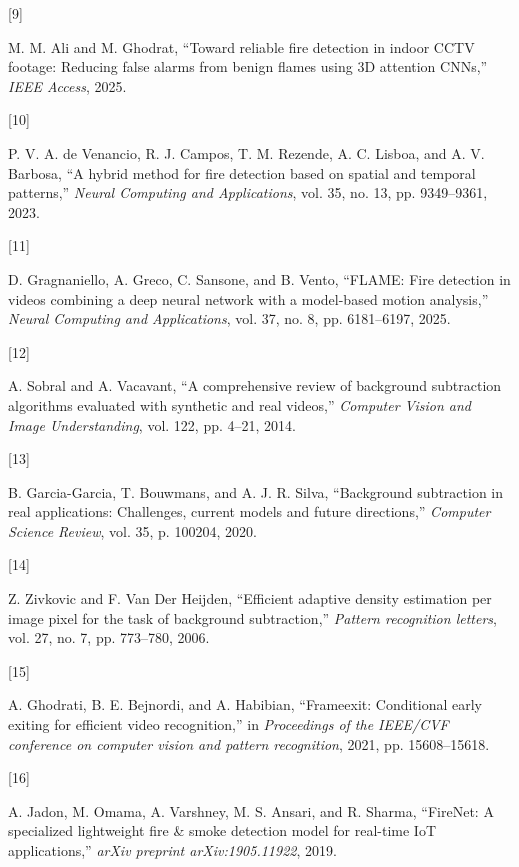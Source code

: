 \documentclass[
  10pt,
]{article}
\newlength{\cslhangindent}
\newlength{\csllabelwidth}
\newenvironment{CSLReferences}[2] %
 {\begin{list}{}{%
  \setlength{\itemindent}{0pt}
  \setlength{\leftmargin}{0pt}
  \setlength{\parsep}{0pt}
  \ifodd #1
   \setlength{\leftmargin}{\cslhangindent}
   \setlength{\itemindent}{-1\cslhangindent}
  \fi
  \setlength{\itemsep}{#2\baselineskip}}}
 {\end{list}}
\newcommand{\CSLLeftMargin}[1]{\parbox[t]{\csllabelwidth}{\strut#1\strut}}
\newcommand{\CSLRightInline}[1]{\parbox[t]{\linewidth - \csllabelwidth}{\strut#1\strut}}
\begin{document}
\begin{CSLReferences}{0}{0}
\CSLLeftMargin{{[}9{]} }%
\CSLRightInline{M. M. Ali and M. Ghodrat, {``Toward reliable fire
detection in indoor CCTV footage: Reducing false alarms from benign
flames using 3D attention CNNs,''} \emph{IEEE Access}, 2025.}

\CSLLeftMargin{{[}10{]} }%
\CSLRightInline{P. V. A. de Venancio, R. J. Campos, T. M. Rezende, A. C.
Lisboa, and A. V. Barbosa, {``A hybrid method for fire detection based
on spatial and temporal patterns,''} \emph{Neural Computing and
Applications}, vol. 35, no. 13, pp. 9349--9361, 2023.}

\CSLLeftMargin{{[}11{]} }%
\CSLRightInline{D. Gragnaniello, A. Greco, C. Sansone, and B. Vento,
{``FLAME: Fire detection in videos combining a deep neural network with
a model-based motion analysis,''} \emph{Neural Computing and
Applications}, vol. 37, no. 8, pp. 6181--6197, 2025.}

\CSLLeftMargin{{[}12{]} }%
\CSLRightInline{A. Sobral and A. Vacavant, {``A comprehensive review of
background subtraction algorithms evaluated with synthetic and real
videos,''} \emph{Computer Vision and Image Understanding}, vol. 122, pp.
4--21, 2014.}

\CSLLeftMargin{{[}13{]} }%
\CSLRightInline{B. Garcia-Garcia, T. Bouwmans, and A. J. R. Silva,
{``Background subtraction in real applications: Challenges, current
models and future directions,''} \emph{Computer Science Review}, vol.
35, p. 100204, 2020.}

\CSLLeftMargin{{[}14{]} }%
\CSLRightInline{Z. Zivkovic and F. Van Der Heijden, {``Efficient
adaptive density estimation per image pixel for the task of background
subtraction,''} \emph{Pattern recognition letters}, vol. 27, no. 7, pp.
773--780, 2006.}

\CSLLeftMargin{{[}15{]} }%
\CSLRightInline{A. Ghodrati, B. E. Bejnordi, and A. Habibian,
{``Frameexit: Conditional early exiting for efficient video
recognition,''} in \emph{Proceedings of the IEEE/CVF conference on
computer vision and pattern recognition}, 2021, pp. 15608--15618.}

\CSLLeftMargin{{[}16{]} }%
\CSLRightInline{A. Jadon, M. Omama, A. Varshney, M. S. Ansari, and R.
Sharma, {``FireNet: A specialized lightweight fire \& smoke detection
model for real-time IoT applications,''} \emph{arXiv preprint
arXiv:1905.11922}, 2019.}


\end{CSLReferences}
\end{document}

